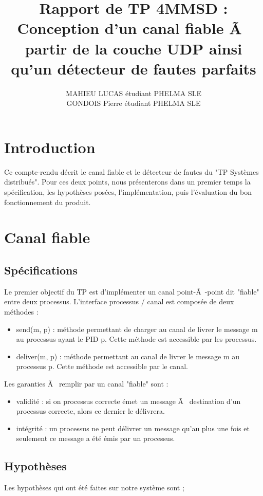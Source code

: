 \documentclass[a4paper, 10pt, french]{article}
\title{Rapport de TP 4MMSD : Conception d'un canal fiable Ã  partir de la couche UDP ainsi qu'un détecteur de fautes parfaits}
\author{ MAHIEU LUCAS étudiant PHELMA SLE 
\\ GONDOIS Pierre étudiant PHELMA SLE
}
\begin{document}
\maketitle

\section{Introduction}
Ce compte-rendu décrit le canal fiable et le détecteur de fautes du "TP Systèmes distribués". Pour ces deux points, nous présenterons dans un premier temps la spécification, les hypothèses posées, l'implémentation, puis l'évaluation du bon fonctionnement du produit.

\section{Canal fiable}

\subsection{Spécifications}
Le premier objectif du TP est d'implémenter un canal point-Ã -point dit "fiable" entre deux processus. L'interface processus / canal est composée de deux méthodes :

\begin{itemize}
	\item send(m, p) : méthode permettant de charger au canal de livrer le message m au processus ayant le PID p. Cette méthode est accessible par les processus.
	\item deliver(m, p) : méthode permettant au canal de livrer le message m au processus p. Cette méthode est accessible par le canal.\newline
\end{itemize}
	
	Les garanties Ã  remplir par un canal "fiable" sont :
\begin{itemize}
	\item validité : si on processus correcte émet un message Ã  destination d'un processus correcte, alors ce dernier le délivrera.
	\item intégrité : un processus ne peut délivrer un message qu'au plus une fois et seulement ce message a été émis par un processus.
\end{itemize}

\subsection{Hypothèses}
Les hypothèses qui ont été faites sur notre système sont ; 
\end{document}
